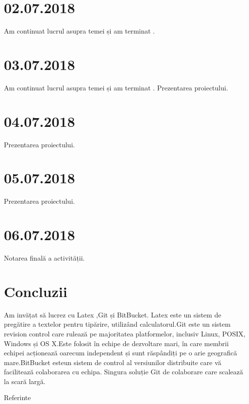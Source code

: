 \documentclass{report}
\begin{document}
\chapter{02.07.2018}
Am continuat lucrul asupra temei și am terminat .
\chapter{03.07.2018}
Am continuat lucrul asupra temei și am terminat .
Prezentarea proiectului.
\chapter{04.07.2018}
Prezentarea proiectului.
\chapter{05.07.2018}
Prezentarea proiectului.
\chapter{06.07.2018}

Notarea finală a activității.

\chapter{Concluzii}
Am invățat să lucrez cu Latex ,Git și BitBucket.
Latex este un sistem de pregătire a textelor pentru tipărire, utilizând
calculatorul.Git este un sistem revision control care rulează pe majoritatea platformelor, inclusiv Linux, POSIX, Windows și OS X.Este folosit în echipe de dezvoltare mari, în care membrii echipei acționează oarecum independent și sunt răspândiți pe o arie geografică mare.BitBucket esteun sistem de control al versiunilor distribuite care vă facilitează colaborarea cu echipa. Singura soluție Git de colaborare care scalează la scară largă.

Referinte \cite{book:1} \cite{book:25008} \cite{book:776133} \cite{book:1045183}


 

\end{document}
